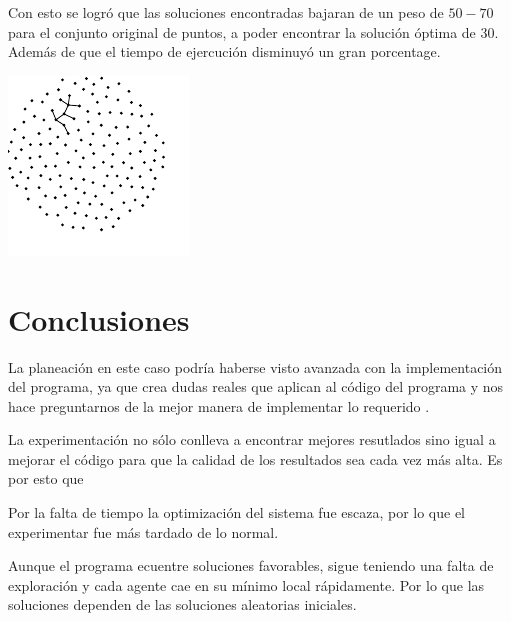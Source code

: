 \documentclass[a4paper]{report}
\begin{document}
Con esto se logr\'o que las soluciones encontradas bajaran de un peso de $50-70$ para el conjunto
original de puntos, a poder encontrar la soluci\'on \'optima de 30. Adem\'as de que el tiempo de ejercuci\'on disminuy\'o un gran porcentage.

\includegraphics[width=\textwidth]{alpha.pdf}



\section*{Conclusiones}
La planeaci\'on en este caso podr\'ia haberse visto avanzada con la implementaci\'on del programa,
ya que crea dudas reales que aplican al c\'odigo del programa y nos hace preguntarnos de la mejor
manera de implementar lo requerido .

La experimentaci\'on no s\'olo conlleva a encontrar mejores resutlados sino igual a mejorar el
c\'odigo para que la calidad de los resultados sea cada vez m\'as alta. Es por esto que

Por la falta de tiempo la optimización del sistema fue escaza, por lo que el experimentar fue m\'as
tardado de lo normal.

Aunque el programa ecuentre soluciones favorables, sigue teniendo una falta de exploraci\'on y cada agente cae en su m\'inimo local r\'apidamente. Por lo que las soluciones dependen de las soluciones aleatorias iniciales.
\end{document}
